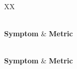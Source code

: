 \begin{texcodeonly}[]{}
  \begin{xltabular}{\textwidth}{XX}
    \caption{左对齐} \\

      \toprule
      \textbf{Symptom} & \textbf{Metric} \\
      \midrule
    \endfirsthead %

       \\
      \toprule
      \textbf{Symptom} & \textbf{Metric} \\
      \midrule
    \endhead %

      \bottomrule
       \\
    \endfoot %

      \bottomrule
    \endlastfoot %


\end{xltabular}
\end{texcodeonly}
